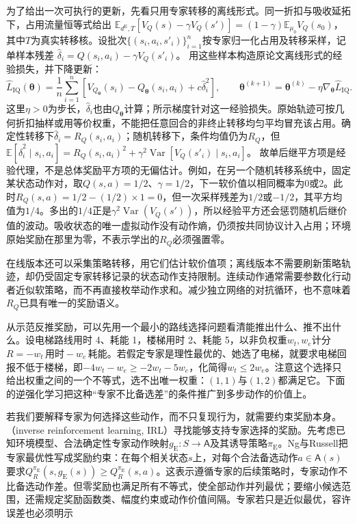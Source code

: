 为了给出一次可执行的更新，先看只用专家转移的离线形式。同一折扣与吸收延拓下，占用流量恒等式给出
$\mathbb E_{d^{\mathrm E},T}[V_Q(s)-\gamma V_Q(s')]
=(1-\gamma)\mathbb E_{\mu_0}V_Q(s_0)$，
其中$T$为真实转移核。设批次$\{(s_i,a_i,s'_i)\}_{i=1}^n$按专家归一化占用及转移采样，记单样本残差
$\widehat\delta_i=Q(s_i,a_i)-\gamma V_Q(s'_i)$。
用这些样本构造原论文离线形式的经验损失，并下降更新：
\[
  \widehat L_{\mathrm{IQ}}(\bm\theta)
  =\frac1n\sum_{i=1}^n
      \left[V_{Q_{\bm\theta}}(s_i)-Q_{\bm\theta}(s_i,a_i)
                    +c\widehat\delta_i^2\right],
  \qquad
  \bm\theta^{(k+1)}
  =\bm\theta^{(k)}-\eta\nabla_{\bm\theta}\widehat L_{\mathrm{IQ}}.
\]
这里$\eta>0$为步长，$\widehat\delta_i$也由$Q_{\bm\theta}$计算；所示梯度针对这一经验损失。原始轨迹可按几何折扣抽样或用等价权重，不能把任意回合的非终止转移均匀平均冒充该占用。确定性转移下$\widehat\delta_i=R_Q(s_i,a_i)$；随机转移下，条件均值仍为$R_Q$，但
$\mathbb E[\widehat\delta_i^2\mid s_i,a_i]
=R_Q(s_i,a_i)^2+\gamma^2\operatorname{Var}[V_Q(s'_i)\mid s_i,a_i]$。
故单后继平方项是经验代理，不是总体奖励平方项的无偏估计。例如，在另一个随机转移系统中，固定某状态动作对，取$Q(s,a)=1/2$、$\gamma=1/2$，下一软价值以相同概率为0或2。此时$R_Q(s,a)=1/2-(1/2)\times1=0$，但一次采样残差为$1/2$或$-1/2$，其平方均值为$1/4$。多出的$1/4$正是$\gamma^2\operatorname{Var}(V_Q(s'))$，所以经验平方还会惩罚随机后继价值的波动。吸收状态的唯一虚拟动作没有动作熵，仍须按共同协议计入占用；环境原始奖励在那里为零，不表示学出的$R_Q$必须强置零。

在线版本还可以采集策略转移，用它们估计软价值项；离线版本不需要刷新策略轨迹，却仍受固定专家转移记录的状态动作支持限制。连续动作通常需要参数化行动者近似软策略，而不再直接枚举动作求和。减少独立网络的对抗循环，也不意味着$R_Q$已具有唯一的奖励语义。

从示范反推奖励，可以先用一个最小的路线选择问题看清能推出什么、推不出什么。设电梯路线用时 4、耗能 1，楼梯用时 2、耗能 5，以非负权重$w_t,w_e$计分$R=-w_t\,\text{用时}-w_e\,\text{耗能}$。若假定专家是理性最优的、她选了电梯，就要求电梯回报不低于楼梯，即$-4w_t-w_e\geq-2w_t-5w_e$，化简得$w_t\leq2w_e$。注意这个选择只给出权重之间的一个不等式，选不出唯一权重：$(1,1)$与$(1,2)$都满足它。下面的逆强化学习把这种“专家不比备选差”的条件推广到多步动作的价值上。

若我们要解释专家为何选择这些动作，而不只复现行为，就需要约束奖励本身。（inverse reinforcement learning, IRL）寻找能够支持专家选择的奖励。先考虑已知环境模型、合法确定性专家动作映射$g_{\mathrm E}:S\to\mathsf A$及其诱导策略$\pi_{\mathrm E}$。Ng与Russell把专家最优性写成奖励约束：在每个相关状态$s$上，对每个合法备选动作$a\in\mathsf A(s)$要求$Q_R^{\pi_{\mathrm E}}(s,g_{\mathrm E}(s))\geq Q_R^{\pi_{\mathrm E}}(s,a)$。这表示遵循专家的后续策略时，专家动作不比备选动作差。但零奖励也满足所有不等式，使全部动作并列最优；要缩小候选范围，还需规定奖励函数类、幅度约束或动作价值间隔。专家若只是近似最优，容许误差也必须明示

